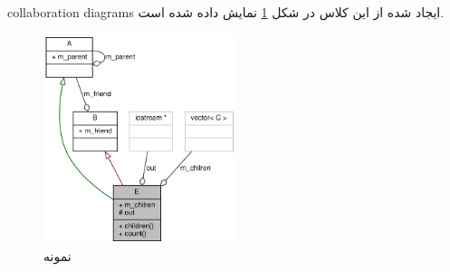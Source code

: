 \glspl{collaboration diagram} ایجاد شده از این کلاس در شکل
\ref{image/write/graph/example/class_e__coll__graph} نمایش داده شده است.


\begin{figure}
	\centering
	\includegraphics[width=0.5\textwidth]{image/write/graph/example/class_e__coll__graph}
	\caption[نمونه]{
		نمونه
	}
	\label{image/write/graph/example/class_e__coll__graph}
\end{figure}

% 
% 

